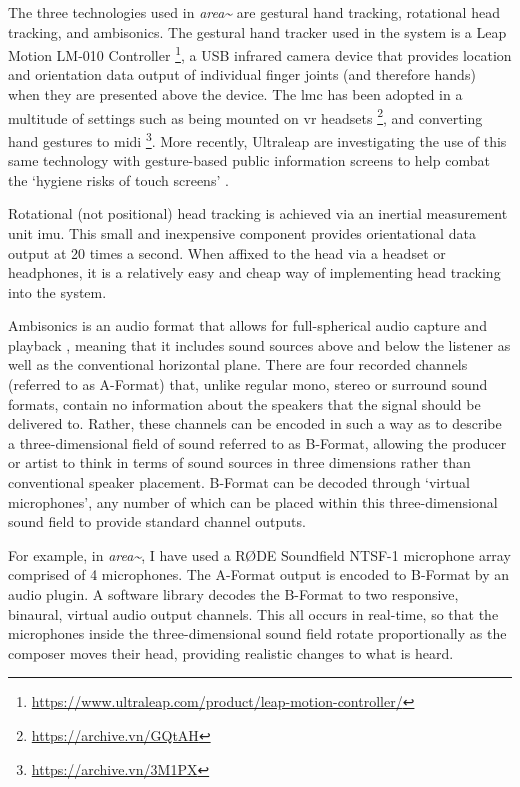 The three technologies used in \textit{area\textasciitilde{}} are gestural hand tracking, rotational head tracking, and ambisonics. The gestural hand tracker used in the system is a Leap Motion LM-010 Controller \footnote{\url{https://www.ultraleap.com/product/leap-motion-controller/}}, a USB infrared camera device that provides location and orientation data output of individual finger joints (and therefore hands) when they are presented above the device. The \gls{lmc} has been adopted in a multitude of settings such as being mounted on \gls{vr} headsets \footnote{\url{https://archive.vn/GQtAH}}, and converting hand gestures to \gls{midi} \footnote{\url{https://archive.vn/3M1PX}}. More recently, Ultraleap are investigating the use of this same technology with gesture-based public information screens to help combat the `hygiene risks of touch screens' \citeyearpar{ultraleap2020a}.

Rotational (not positional) head tracking is achieved via an inertial measurement unit \gls{imu}. This small and inexpensive component provides orientational data output at 20 times a second. When affixed to the head via a headset or headphones, it is a relatively easy and cheap way of implementing head tracking into the system.

Ambisonics is an audio format that allows for full-spherical audio capture and playback \citep{gerzon1973}, meaning that it includes sound sources above and below the listener as well as the conventional horizontal plane. There are four recorded channels (referred to as A-Format) that, unlike regular mono, stereo or surround sound formats, contain no information about the speakers that the signal should be delivered to. Rather, these channels can be encoded in such a way as to describe a three-dimensional field of sound referred to as B-Format, allowing the producer or artist to think in terms of sound sources in three dimensions rather than conventional speaker placement. B-Format can be decoded through `virtual microphones', any number of which can be placed within this three-dimensional sound field to provide standard channel outputs.

For example, in \textit{area\textasciitilde{}}, I have used a RØDE Soundfield NTSF-1 microphone array comprised of 4 microphones. The A-Format output is encoded to B-Format by an audio plugin. A software library decodes the B-Format to two responsive, binaural, virtual audio output channels. This all occurs in real-time, so that the microphones inside the three-dimensional sound field rotate proportionally as the composer moves their head, providing realistic changes to what is heard.



